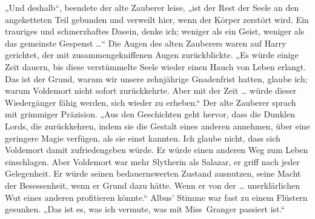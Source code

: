„Und deshalb“, beendete der alte Zauberer leise, „ist der Rest der Seele an den angeketteten Teil gebunden und verweilt hier, wenn der Körper zerstört wird. Ein trauriges und schmerzhaftes Dasein, denke ich; weniger als ein Geist, weniger als das gemeinste Gespenst …“ Die Augen des alten Zauberers waren auf Harry gerichtet, der mit zusammengekniffenen Augen zurückblickte.
„Es würde einige Zeit dauern, bis diese verstümmelte Seele wieder einen Hauch von Leben erlangt. Das ist der Grund, warum wir unsere zehnjährige Gnadenfrist hatten, glaube ich; warum Voldemort nicht sofort zurückkehrte. Aber mit der Zeit … würde dieser Wiedergänger fähig werden, sich wieder zu erheben.“ Der alte Zauberer sprach mit grimmiger Präzision.
„Aus den Geschichten geht hervor, dass die Dunklen Lords, die zurückkehren, indem sie die Gestalt eines anderen annehmen, über eine geringere Magie verfügen, als sie einst kannten. Ich glaube nicht, dass sich Voldemort damit zufriedengeben würde. Er würde einen anderen Weg zum Leben einschlagen. Aber Voldemort war mehr Slytherin als Salazar, er griff nach jeder Gelegenheit. Er würde seinen bedauernswerten Zustand ausnutzen, seine Macht der Besessenheit, wenn er Grund dazu hätte. Wenn er von der … unerklärlichen Wut eines anderen profitieren könnte.“ Albus’ Stimme war fast zu einem Flüstern gesunken.
„Das ist es, was ich vermute, was mit Miss~Granger passiert ist.“

